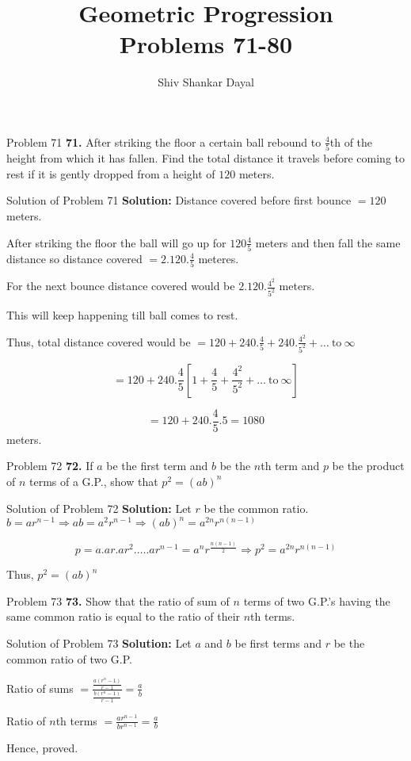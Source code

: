 \documentclass[aspectratio=1610,8pt]{beamer}
\title{Geometric Progression\\Problems 71-80}
\author[Shiv Shankar Dayal]{Shiv Shankar Dayal}
\begin{document}
\begin{frame}
  \titlepage
\end{frame}
\begin{frame}{Problem 71}
  \textbf{71.} After striking the floor a certain ball rebound to $\frac{4}{5}$th of the height from which it has fallen. Find the
  total distance it travels before coming to rest if it is gently dropped from a height of $120$ meters.
\end{frame}
\begin{frame}{Solution of Problem 71}
  \textbf{Solution:} Distance covered before first bounce $= 120$ meters.

  After striking the floor the ball will go up for $120\frac{4}{5}$ meters and then fall the same distance so distance covered $=
  2.120.\frac{4}{5}$ meteres.

  For the next bounce distance covered would be $2.120.\frac{4^2}{5^2}$ meters.

  This will keep happening till ball comes to rest.

  Thus, total distance covered would be $= 120 + 240.\frac{4}{5} + 240.\frac{4^2}{5^2} + \ldots~\text{to}~\infty$

  $$= 120 + 240.\frac{4}{5}\left[1 + \frac{4}{5} + \frac{4^2}{5^2} + \ldots~\text{to}~\infty\right]$$

  $$= 120 + 240.\frac{4}{5}.5 = 1080$$ meters.
\end{frame}
\begin{frame}{Problem 72}
  \textbf{72.} If $a$ be the first term and $b$ be the $n$th term and $p$ be the product of $n$ terms of a G.P., show that $p^2 =
  (ab)^n$
\end{frame}
\begin{frame}{Solution of Problem 72}
  \textbf{Solution:} Let $r$ be the common ratio. $b = ar^{n - 1} \Rightarrow ab = a^2r^{n - 1}\Rightarrow (ab)^n = a^{2n}r^{n(n - 1)}$

  $$p = a.ar.ar^2.\ldots.ar^{n - 1} = a^nr^{\frac{n(n - 1)}{2}} \Rightarrow p^2 = a^{2n}r^{n(n - 1)}$$

  Thus, $p^2 = (ab)^n$
\end{frame}
\begin{frame}{Problem 73}
  \textbf{73.} Show that the ratio of sum of $n$ terms of two G.P.'s having the same common ratio is equal to the ratio of their
  $n$th terms.
\end{frame}
\begin{frame}{Solution of Problem 73}
  \textbf{Solution:} Let $a$ and $b$ be first terms and $r$ be the common ratio of two G.P.

  Ratio of sums $= \frac{\frac{a(r^n - 1)}{r - 1}}{\frac{b(r^n - 1)}{r - 1}} = \frac{a}{b}$

  Ratio of $n$th terms $= \frac{ar^{n - 1}}{br^{n - 1}} = \frac{a}{b}$

  Hence, proved.
\end{frame}
\end{document}
